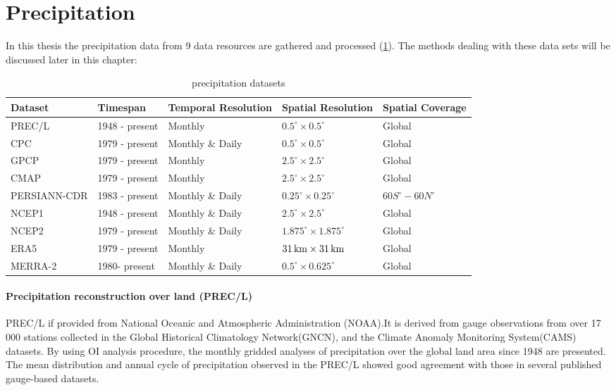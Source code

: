\section{Precipitation}
In this thesis the precipitation data from 9 data resources are gathered and processed (\ref{tab:pre}). The methods dealing with these data sets will be discussed later in this chapter:
\begin{table}[htbp]\centering 
	\begin{tabular}{|l|l|l|l|l|}
		\hline
		Dataset      & Timespan       & Temporal Resolution & Spatial Resolution & Spatial Coverage \\ \hline
		PREC/L       & 1948 - present & Monthly             & $0.5^{\circ} \times 0.5^{\circ}$          & Global           \\ \hline
		CPC          & 1979 - present & Monthly \& Daily    & $0.5^{\circ} \times 0.5^{\circ}$          & Global           \\ \hline
		GPCP         & 1979 - present & Monthly             & $2.5^{\circ} \times 2.5^{\circ}$          & Global           \\ \hline
		CMAP         & 1979 - present & Monthly             & $2.5^{\circ} \times 2.5^{\circ}$          & Global           \\ \hline
		PERSIANN-CDR & 1983 - present & Monthly \& Daily    & $0.25^{\circ} \times 0.25^{\circ}$        & $60S^{\circ} - 60N^{\circ}$      \\ \hline
		NCEP1        & 1948 - present & Monthly \& Daily    & $2.5^{\circ} \times 2.5^{\circ}$          & Global           \\ \hline
		NCEP2        & 1979 - present & Monthly \& Daily    & $1.875^{\circ} \times 1.875^{\circ}$      & Global           \\ \hline
		ERA5         & 1979 - present & Monthly             & $31\,\mathrm{km} \times 31\,\mathrm{km}$        & Global           \\ \hline
		MERRA-2      & 1980- present  & Monthly \& Daily    & $0.5^{\circ} \times 0.625^{\circ}$        & Global           \\ \hline
	\end{tabular}
	\caption{precipitation datasets}
	\label{tab:pre}
\end{table}
\paragraph{Precipitation reconstruction over land (PREC/L)}
PREC/L if provided from National Oceanic and Atmospheric Administration (NOAA).It is derived from gauge observations from over 17 000 stations collected in the Global Historical Climatology Network(GNCN), and the Climate Anomaly Monitoring System(CAMS) datasets. By using OI analysis procedure, the monthly gridded analyses of precipitation over the global land area since 1948 are presented. The mean distribution and annual cycle of precipitation observed in the PREC/L showed good agreement with those in several published gauge-based datasets. \cite{chen2002global}
